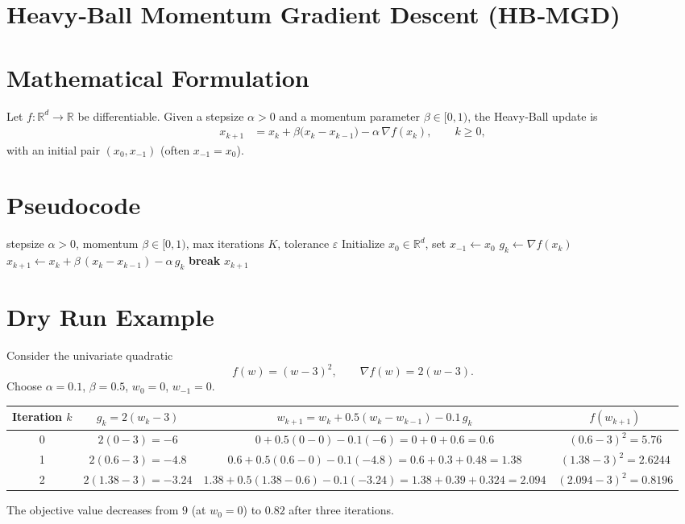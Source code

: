 \documentclass{article}
\newcommand{\grad}{\nabla}
\begin{document}
\section*{Heavy‑Ball Momentum Gradient Descent (HB‑MGD)}

\section*{Mathematical Formulation}
Let $f:\mathbb{R}^{d}\rightarrow\mathbb{R}$ be differentiable.  
Given a stepsize $\alpha>0$ and a momentum parameter $\beta\in[0,1)$, the Heavy‑Ball update is
\[
\boxed{
\begin{aligned}
x_{k+1}&=x_{k}+\beta\bigl(x_{k}-x_{k-1}\bigr)-\alpha\,\grad f(x_{k}),\qquad k\ge 0,
\end{aligned}}
\]
with an initial pair $(x_{0},x_{-1})$ (often $x_{-1}=x_{0}$).

\section*{Pseudocode}
\begin{algorithm}[H]
\caption{Heavy‑Ball Momentum Gradient Descent}
\begin{algorithmic}[1]
\Require stepsize $\alpha>0$, momentum $\beta\in[0,1)$, max iterations $K$, tolerance $\varepsilon$
\State Initialize $x_{0}\in\mathbb{R}^{d}$, set $x_{-1}\gets x_{0}$
    \State $g_{k}\gets \grad f(x_{k})$
    \State $x_{k+1}\gets x_{k}+\beta\,(x_{k}-x_{k-1})-\alpha\,g_{k}$
        \State \textbf{break}
    \EndIf
\EndFor
\State \Return $x_{k+1}$
\end{algorithmic}
\end{algorithm}

\section*{Dry Run Example}
Consider the univariate quadratic
\[
f(w)=(w-3)^{2},\qquad \grad f(w)=2(w-3).
\]
Choose $\alpha=0.1$, $\beta=0.5$, $w_{0}=0$, $w_{-1}=0$.

\begin{center}
\begin{tabular}{c|c|c|c}
Iteration $k$ & $g_{k}=2(w_{k}-3)$ & $w_{k+1}=w_{k}+0.5(w_{k}-w_{k-1})-0.1\,g_{k}$ & $f(w_{k+1})$\\ \hline
0 & $2(0-3)=-6$ &
$0+0.5(0-0)-0.1(-6)=0+0+0.6=0.6$ &
$(0.6-3)^{2}=5.76$\\[4pt]
1 & $2(0.6-3)=-4.8$ &
$0.6+0.5(0.6-0)-0.1(-4.8)=0.6+0.3+0.48=1.38$ &
$(1.38-3)^{2}=2.6244$\\[4pt]
2 & $2(1.38-3)=-3.24$ &
$1.38+0.5(1.38-0.6)-0.1(-3.24)=1.38+0.39+0.324=2.094$ &
$(2.094-3)^{2}=0.8196$
\end{tabular}
\end{center}
The objective value decreases from $9$ (at $w_{0}=0$) to $0.82$ after three iterations.
\end{document}

